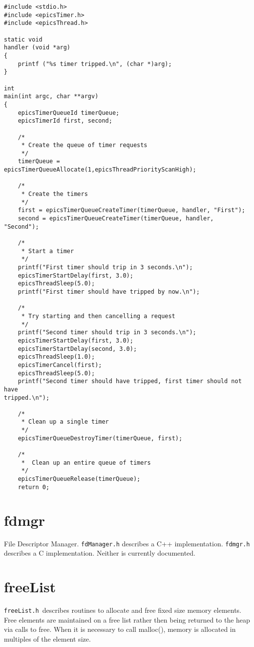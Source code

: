 \begin{verbatim}#include <stdio.h>
#include <epicsTimer.h>
#include <epicsThread.h>

static void
handler (void *arg)
{
    printf ("%s timer tripped.\n", (char *)arg);
}

int
main(int argc, char **argv)
{
    epicsTimerQueueId timerQueue;
    epicsTimerId first, second;

    /*
     * Create the queue of timer requests
     */
    timerQueue = epicsTimerQueueAllocate(1,epicsThreadPriorityScanHigh);

    /*
     * Create the timers
     */
    first = epicsTimerQueueCreateTimer(timerQueue, handler, "First");
    second = epicsTimerQueueCreateTimer(timerQueue, handler, "Second");

    /*
     * Start a timer
     */
    printf("First timer should trip in 3 seconds.\n");
    epicsTimerStartDelay(first, 3.0);
    epicsThreadSleep(5.0);
    printf("First timer should have tripped by now.\n");

    /*
     * Try starting and then cancelling a request
     */
    printf("Second timer should trip in 3 seconds.\n");
    epicsTimerStartDelay(first, 3.0);
    epicsTimerStartDelay(second, 3.0);
    epicsThreadSleep(1.0);
    epicsTimerCancel(first);
    epicsThreadSleep(5.0);
    printf("Second timer should have tripped, first timer should not have 
tripped.\n");

    /*
     * Clean up a single timer
     */
    epicsTimerQueueDestroyTimer(timerQueue, first);

    /*
     *  Clean up an entire queue of timers
     */
    epicsTimerQueueRelease(timerQueue);
    return 0;
\end{verbatim}\section{  fdmgr}

File Descriptor Manager. \verb|fdManager.h| describes a C++ implementation. \verb|fdmgr.h| describes a C implementation. 
Neither is currently documented.

\section{freeList}

\verb|freeList.h |describes routines to allocate and free fixed size memory elements.   Free elements are maintained on a 
free list rather then being returned to the heap via calls to free. When it is necessary to call malloc(), memory is allocated 
in multiples of the element size.

